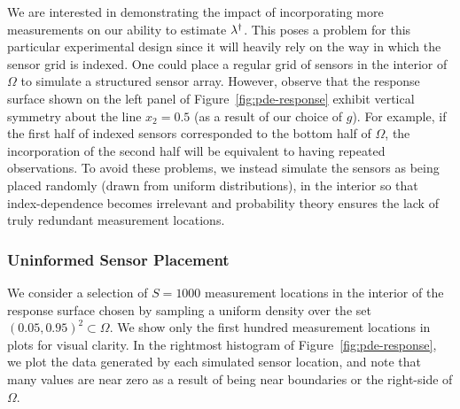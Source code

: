 We are interested in demonstrating the impact of incorporating more measurements on our ability to estimate $\lambda^\dagger$.
This poses a problem for this particular experimental design since it will heavily rely on the way in which the sensor grid is indexed.
One could place a regular grid of sensors in the interior of $\Omega$ to simulate a structured sensor array.
However, observe that the response surface shown on the left panel of Figure~\ref{fig:pde-response} exhibit vertical symmetry about the line $x_2=0.5$ (as a result of our choice of $g$).
For example, if the first half of indexed sensors corresponded to the bottom half of $\Omega$, the incorporation of the second half will be equivalent to having repeated observations.
To avoid these problems, we instead simulate the sensors as being placed randomly (drawn from uniform distributions), in the interior so that index-dependence becomes irrelevant and probability theory ensures the lack of truly redundant measurement locations.

\FloatBarrier
\subsubsection{Uninformed Sensor Placement}

We consider a selection of $S=1000$ measurement locations in the interior of the response surface chosen by sampling a uniform density over the set $(0.05, 0.95)^2 \subset \Omega$.
We show only the first hundred measurement locations in plots for visual clarity.
In the rightmost histogram of Figure~\ref{fig:pde-response}, we plot the data generated by each simulated sensor location, and note that many values are near zero as a result of being near boundaries or the right-side of $\Omega$.

